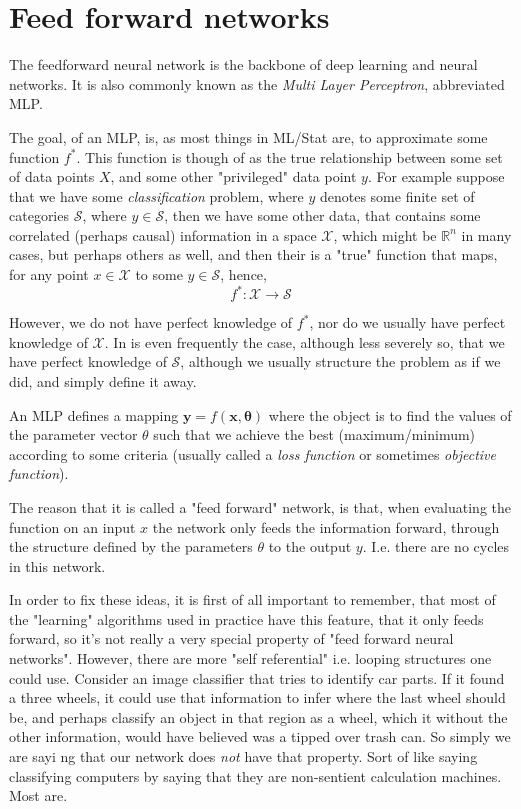 \documentclass[10pt,a4paper]{article}
\begin{document}
\section{Feed forward networks}
The feedforward neural network is the backbone of deep learning and neural networks. It is also commonly known as the \textit{Multi Layer Perceptron}, abbreviated MLP.

The goal, of an MLP, is, as most things in ML/Stat are, to approximate some function $f^*$. This function is though of as the true relationship between some set of data points $X$, and some other "privileged" data point $y$. For example suppose that we have some \textit{classification} problem, where $y$ denotes some finite set of categories $\mathcal{S}$, where $y \in \mathcal{S}$, then we have some other data, that contains some correlated (perhaps causal) information in a space $\mathcal{X}$, which might be $\mathbb{R}^n$ in many cases, but perhaps others as well, and then their is a "true" function that maps, for any point $x \in \mathcal{X}$ to some $y \in \mathcal{S}$, hence,
$$
f^*:\mathcal{X} \rightarrow \mathcal{S}
$$

However, we do not have perfect knowledge of $f^*$, nor do we usually have perfect knowledge of $\mathcal{X}$. In is even frequently the case, although less severely so, that we have perfect knowledge of $\mathcal{S}$, although we usually structure the problem as if we did, and simply define it away.

An MLP defines a mapping $\mathbf{y} = f(\mathbf{x},\boldsymbol\theta)$ where the object is to find the values of the parameter vector $\theta$ such that we achieve the best (maximum/minimum) according to some criteria (usually called a \textit{loss function} or sometimes \textit{objective function}).

The reason that it is called a "feed forward" network, is that, when evaluating the function on an input $x$ the network only feeds the information forward, through the structure defined by the parameters $\theta$ to the output $y$. I.e. there are no cycles in this network.

In order to fix these ideas, it is first of all important to remember, that most of the "learning" algorithms used in practice have this feature, that it only feeds forward, so it's not really a very special property of "feed forward neural networks". However, there are more "self referential" i.e. looping structures one could use. Consider an image classifier that tries to identify car parts. If it found a three wheels, it could use that information to infer where the last wheel should be, and perhaps classify an object in that region as a wheel, which it without the other information, would have believed was a tipped over trash can. So simply we are sayi                                                                                                                                                                                            ng that our network does \textit{not} have that property. Sort of like saying classifying computers by saying that they are non-sentient calculation machines. Most are.
\end{document}
